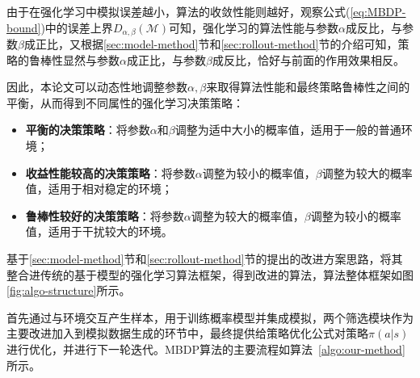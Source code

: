 由于在强化学习中模拟误差越小，算法的收敛性能则越好，观察公式(\ref{eq:MBDP-bound})中的误差上界$D_{\alpha,\beta}(\mathcal{M})$可知，强化学习的算法性能与参数$\alpha$成反比，与参数$\beta$成正比，又根据\ref{sec:model-method}节和\ref{sec:rollout-method}节的介绍可知，策略的鲁棒性显然与参数$\alpha$成正比，与参数$\beta$成反比，恰好与前面的作用效果相反。

因此，本论文可以动态性地调整参数$\alpha,\beta$来取得算法性能和最终策略鲁棒性之间的平衡，从而得到不同属性的强化学习决策策略：

\begin{itemize}
    \item \textbf{平衡的决策策略}：将参数$\alpha$和$\beta$调整为适中大小的概率值，适用于一般的普通环境；
    \item \textbf{收益性能较高的决策策略}：将参数$\alpha$调整为较小的概率值，$\beta$调整为较大的概率值，适用于相对稳定的环境；
    \item \textbf{鲁棒性较好的决策策略}：将参数$\alpha$调整为较大的概率值，$\beta$调整为较小的概率值，适用于干扰较大的环境。
\end{itemize}

基于\ref{sec:model-method}节和\ref{sec:rollout-method}节的提出的改进方案思路，将其整合进传统的基于模型的强化学习算法框架，得到改进的算法，算法整体框架如图\ref{fig:algo-structure}所示。

首先通过与环境交互产生样本，用于训练概率模型并集成模拟，两个筛选模块作为主要改进加入到模拟数据生成的环节中，最终提供给策略优化公式对策略$\pi(a|s)$进行优化，并进行下一轮迭代。MBDP算法的主要流程如算法~\ref{algo:our-method}所示。

